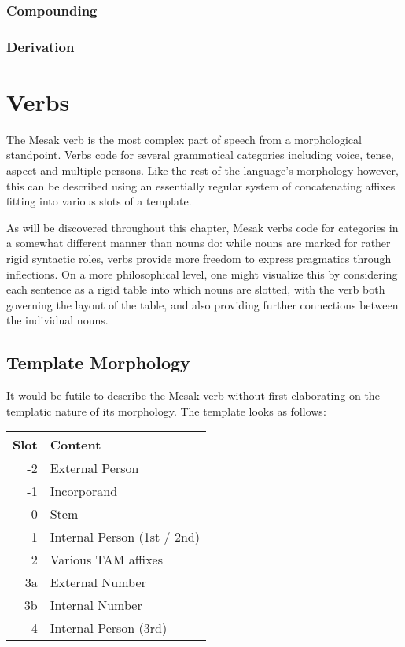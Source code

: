 \documentclass[paper=6in:9in, fontsize=10.5]{scrbook}
\newcommand{\ý}{ɨ́}
\begin{document}
\subsection{Compounding}
\subsection{Derivation}

\chapter{Verbs}
The Mesak verb is the most complex part of speech from a morphological standpoint. Verbs code for several grammatical categories including voice, tense, aspect and multiple persons. Like the rest of the language’s morphology however, this can be described using an essentially regular system of concatenating affixes fitting into various slots of a template.

As will be discovered throughout this chapter, Mesak verbs code for categories in a somewhat different manner than nouns do: while nouns are marked for rather rigid syntactic roles, verbs provide more freedom to express pragmatics through inflections. On a more philosophical level, one might visualize this by considering each sentence as a rigid table into which nouns are slotted, with the verb both governing the layout of the table, and also providing further connections between the individual nouns.


\section{Template Morphology}
It would be futile to describe the Mesak verb without first elaborating on the templatic nature of its morphology. The template looks as follows:

\begin{table}[H]
\centering	
\begin{tabular}{r|l}
Slot & Content                     \\\hline
-2          & External Person             \\
-1          & Incorporand                 \\
0           & Stem                        \\
1           & Internal Person (1st / 2nd) \\
2           & Various TAM affixes         \\
3a          & External Number             \\
3b          & Internal Number             \\
4           & Internal Person (3rd)      
\end{tabular}
\end{table}
\end{document}
